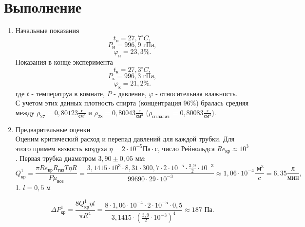 \documentclass[a4paper]{article}
\begin{document}
\section{Выполнение}
\begin{enumerate}

\item Начальные показания 
\begin{equation*}
	t_\text{н} = 27,7 ^\circ C,
\end{equation*}
\begin{equation*}
	P_\text{н} = 996,9 \text{ гПа},
\end{equation*}
\begin{equation*}
	\varphi_\text{н} = 23,3 \%.
\end{equation*}
Показания в конце эксперимента
\begin{equation*}
	t_\text{к} = 27,3 ^\circ C,
\end{equation*}
\begin{equation*}
	P_\text{к} = 996,3 \text{ гПа},
\end{equation*}
\begin{equation*}
	\varphi_\text{к} = 21,2 \%.
\end{equation*}
где $t$ - температруа в комнате, $P$ - давление, $\varphi$ - относительная влажность.\\
С учетом этих данных плотность спирта (концентрация 96\%) бралась средняя между $\rho_{27} = 0,80123 \frac{\text{г}}{\text{см}^3}$ и $\rho_{28} = 0,80043 \frac{\text{г}}{\text{см}^3}$ ($\rho_{\text{сп.залит.}} = 0,80083 \frac{\text{г}}{\text{см}^3}$).

\item Предварительные оценки\\
Оценим критический расход и перепад давлений для каждой трубки. Для этого примем вязкость воздуха $\eta = 2 \cdot 10^{-5} \text{Па}\cdot \text{с}$, число Рейнольдса $Re_\text{кр} \approx 10^3$. Первая трубка диаметром $3,90 \pm 0,05$ мм:\\
\begin{equation*}
    Q_\text{кр}^1 = \frac{\pi Re_\text{кр} R_{\text{газ}} T \eta R}{P \mu_{\text{воз}}} = \frac{3,1415 \cdot 10^3 \cdot8,31 \cdot 300,7 \cdot 2 \cdot10^{-5}\cdot \frac{3,9}{2} \cdot 10^{-3}}{99690 \cdot29 \cdot 10^{-3}} \approx 1,06 \cdot 10^{-4} \frac{\text{ м}^3}{c} = 6,35 \frac{\text{л}}{\text{мин}},
\end{equation*}
1. $l = 0,5 \text{ м}$

\begin{equation*}
    \Delta P_\text{кр}^1 = \frac{8 Q_\text{кр}^1 \eta l}{\pi R^4} = \frac{8 \cdot 1,06 \cdot 10^{-4}\cdot 2 \cdot10^{-5} \cdot 0,5}{3,1415 \cdot (\frac{3,9}{2}\cdot 10^{-3})^4} \approx 187 \text{ Па}.
\end{equation*}


\end{enumerate}
\end{document}

